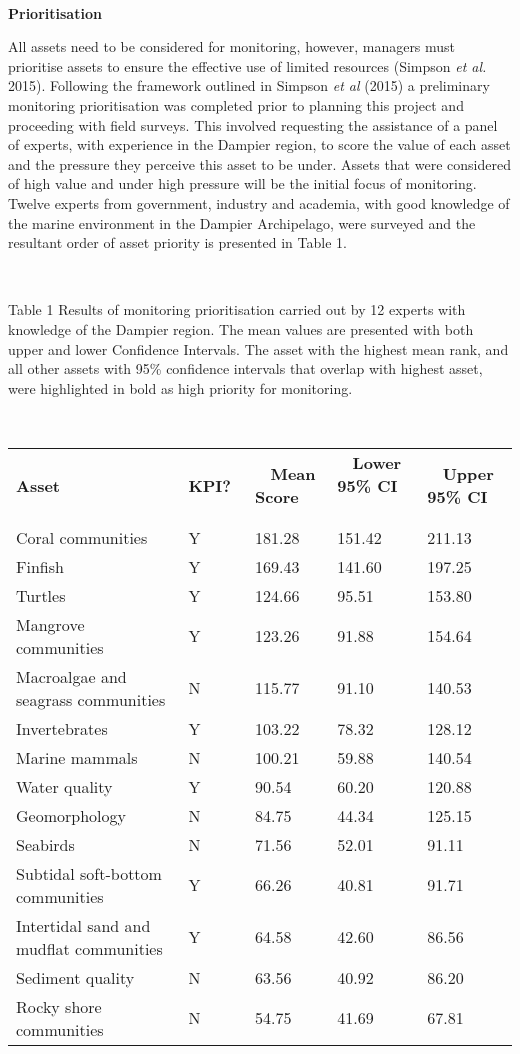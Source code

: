\documentclass[version=last,
    paper=a4,                               %
    10pt,                                   %
    dvipsnames,
    oneside,                              %
    headings=openany,                       %
    open=any,
    BCOR=7mm,                               %
    DIV=15,     %
]{scrbook}
\begin{document}
~

\textbf{Prioritisation}

All assets need to be considered for monitoring, however, managers must
prioritise assets to ensure the effective use of limited resources
(Simpson \emph{et al.} 2015). Following the framework outlined in
Simpson \emph{et al} (2015) a preliminary monitoring prioritisation was
completed prior to planning this project and proceeding with field
surveys. This involved requesting the assistance of a panel of experts,
with experience in the Dampier region, to score the value of each asset
and the pressure they perceive this asset to be under. Assets that were
considered of high value and under high pressure will be the initial
focus of monitoring. Twelve experts from government, industry and
academia, with good knowledge of the marine environment in the Dampier
Archipelago, were surveyed and the resultant order of asset priority is
presented in Table 1.

~

Table 1 Results of monitoring prioritisation carried out by 12 experts
with knowledge of the Dampier region. The mean values are presented with
both upper and lower Confidence Intervals. The asset with the highest
mean rank, and all other assets with 95\% confidence intervals that
overlap with highest asset, were highlighted in bold as high priority
for monitoring.

~

\begin{longtable}[]{@{}lllll@{}}
\toprule
\endhead
\textbf{Asset} & \textbf{~ KPI? ~} & \textbf{~ Mean Score ~} & \textbf{~
Lower 95\% CI ~} & \textbf{~ Upper 95\% CI ~}\tabularnewline
Coral communities & Y & 181.28 & 151.42 & 211.13\tabularnewline
Finfish & Y & 169.43 & 141.60 & 197.25\tabularnewline
Turtles & Y & 124.66 & 95.51 & 153.80\tabularnewline
Mangrove communities & Y & 123.26 & 91.88 & 154.64\tabularnewline
Macroalgae and seagrass communities & N & 115.77 & 91.10 &
140.53\tabularnewline
Invertebrates & Y & 103.22 & 78.32 & 128.12\tabularnewline
Marine mammals & N & 100.21 & 59.88 & 140.54\tabularnewline
Water quality & Y & 90.54 & 60.20 & 120.88\tabularnewline
Geomorphology & N & 84.75 & 44.34 & 125.15\tabularnewline
Seabirds & N & 71.56 & 52.01 & 91.11\tabularnewline
Subtidal soft-bottom communities & Y & 66.26 & 40.81 &
91.71\tabularnewline
Intertidal sand and mudflat communities & Y & 64.58 & 42.60 &
86.56\tabularnewline
Sediment quality & N & 63.56 & 40.92 & 86.20\tabularnewline
Rocky shore communities & N & 54.75 & 41.69 & 67.81\tabularnewline
\bottomrule
\end{longtable}
\end{document}
